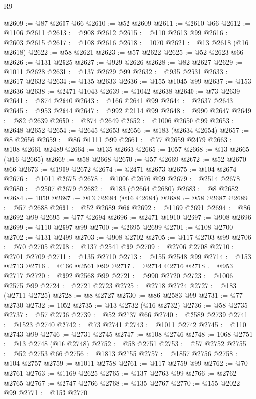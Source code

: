 \begin{lexlean}{R9}
\begin{coremodule}
@2609 := @87 @2607 @66
@2610 := @52 @2609
@2611 := @2610 @66
@2612 := @1106 @2611
@2613 := @908 @2612
@2615 := @110 @2613 @99
@2616 := @2603 @2615
@2617 := @108 @2616
@2618 := 1070
@2621 := @13 @2618 (@16 @2618)
@2622 := @58 @2621
@2623 := @57 @2622
@2625 := @52 @2623 @66
@2626 := @131 @2625
@2627 := @929 @2626
@2628 := @82 @2627
@2629 := @1011 @2628
@2631 := @137 @2629 @99
@2632 := @935 @2631
@2633 := @2617 @2632
@2634 := @135 @2633
@2636 := @155 @1045 @99
@2637 := @153 @2636
@2638 := @2471 @1043
@2639 := @1042 @2638
@2640 := @73 @2639
@2641 := @874 @2640
@2643 := @166 @2641 @99
@2644 := @2637 @2643
@2645 := @953 @2644
@2647 := @992 @2114 @99
@2648 := @990 @2647
@2649 := @82 @2639
@2650 := @874 @2649
@2652 := @1006 @2650 @99
@2653 := @2648 @2652
@2654 := @2645 @2653
@2656 := @183 (@2634 @2654)
@2657 := @8 @2656
@2659 := @86 @1111 @99
@2661 := @77 @2659 @2479
@2663 := @108 @2661 @2489
@2664 := @135 @2663
@2665 := 1057
@2668 := @13 @2665 (@16 @2665)
@2669 := @58 @2668
@2670 := @57 @2669
@2672 := @52 @2670 @66
@2673 := @1909 @2672
@2674 := @2471 @2673
@2675 := @104 @2674
@2676 := @1011 @2675
@2678 := @1006 @2676 @99
@2679 := @2514 @2678
@2680 := @2507 @2679
@2682 := @183 (@2664 @2680)
@2683 := @8 @2682
@2684 := 1059
@2687 := @13 @2684 (@16 @2684)
@2688 := @58 @2687
@2689 := @57 @2688
@2691 := @52 @2689 @66
@2692 := @1169 @2691
@2694 := @86 @2692 @99
@2695 := @77 @2694
@2696 := @2471 @1910
@2697 := @908 @2696
@2699 := @110 @2697 @99
@2700 := @2695 @2699
@2701 := @108 @2700
@2702 := @131 @2499
@2703 := @908 @2702
@2705 := @117 @2703 @99
@2706 := @70 @2705
@2708 := @137 @2541 @99
@2709 := @2706 @2708
@2710 := @2701 @2709
@2711 := @135 @2710
@2713 := @155 @2548 @99
@2714 := @153 @2713
@2716 := @166 @2561 @99
@2717 := @2714 @2716
@2718 := @953 @2717
@2720 := @992 @2568 @99
@2721 := @990 @2720
@2723 := @1006 @2575 @99
@2724 := @2721 @2723
@2725 := @2718 @2724
@2727 := @183 (@2711 @2725)
@2728 := @8 @2727
@2730 := @86 @2583 @99
@2731 := @77 @2730
@2732 := 1052
@2735 := @13 @2732 (@16 @2732)
@2736 := @58 @2735
@2737 := @57 @2736
@2739 := @52 @2737 @66
@2740 := @2589 @2739
@2741 := @1523 @2740
@2742 := @73 @2741
@2743 := @1011 @2742
@2745 := @110 @2743 @99
@2746 := @2731 @2745
@2747 := @108 @2746
@2748 := 1068
@2751 := @13 @2748 (@16 @2748)
@2752 := @58 @2751
@2753 := @57 @2752
@2755 := @52 @2753 @66
@2756 := @1813 @2755
@2757 := @1857 @2756
@2758 := @104 @2757
@2759 := @1011 @2758
@2761 := @117 @2759 @99
@2762 := @70 @2761
@2763 := @1169 @2625
@2765 := @137 @2763 @99
@2766 := @2762 @2765
@2767 := @2747 @2766
@2768 := @135 @2767
@2770 := @155 @2022 @99
@2771 := @153 @2770

\end{coremodule}
\end{lexlean}
